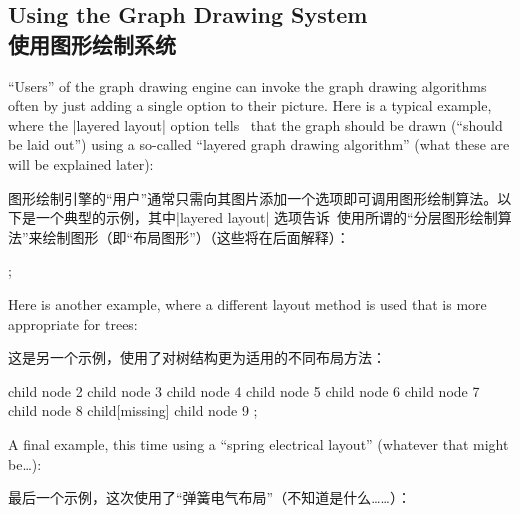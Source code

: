 \subsection{Using the Graph Drawing System\\使用图形绘制系统}

``Users'' of the graph drawing engine can invoke the graph drawing algorithms
often by just adding a single option to their picture. Here is a typical
example, where the |layered layout| option tells \tikzname\ that the graph
should be drawn (``should be laid out'') using a so-called ``layered graph
drawing algorithm'' (what these are will be explained later):

图形绘制引擎的“用户”通常只需向其图片添加一个选项即可调用图形绘制算法。以下是一个典型的示例，其中|layered layout| 选项告诉\tikzname\ 使用所谓的“分层图形绘制算法”来绘制图形（即“布局图形”）（这些将在后面解释）：


\begin{codeexample}[preamble={\usetikzlibrary{arrows.meta,graphs,graphdrawing}
\usegdlibrary{layered}}]
\tikz [>={Stealth[round,sep]}]
  ;
\end{codeexample}
%
Here is another example, where a different layout method is used that is more
appropriate for trees:

这是另一个示例，使用了对树结构更为适用的不同布局方法：


\begin{codeexample}[preamble={\usetikzlibrary{graphdrawing}
\usegdlibrary{trees}}]
\tikz [grow'=up, binary tree layout, nodes={circle,draw}]
  child { node {2}
    child { node {3} }
    child { node {4}
      child { node {5} }
      child { node {6} }
    }
  }
  child { node {7}
    child { node {8}
      child[missing]
      child { node {9} }
    }
  };
\end{codeexample}
%
A final example, this time using a ``spring electrical layout'' (whatever that
might be\dots):

最后一个示例，这次使用了“弹簧电气布局”（不知道是什么……）：


\begin{codeexample}[
    preamble={\usetikzlibrary{decorations.pathmorphing,graphdrawing}
\usegdlibrary{force}}]
\end{codeexample}

